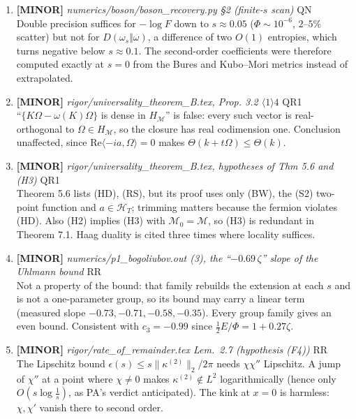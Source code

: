 \documentclass[11pt]{article}
\begin{document}
\begin{enumerate}[leftmargin=1.6em,itemsep=6pt]
\item \textbf{[MINOR]} \emph{numerics/boson/boson\_recovery.py \S2 (finite-\(s\) scan)} \hfill\textsc{QN}\\ Double precision suffices for \(-\log F\) down to \(s\approx0.05\) (\(\Phi\sim10^{-6}\), \(2\)--\(5\%\) scatter) but not for \(D(\omega_s\Vert\omega)\), a difference of two \(O(1)\) entropies, which turns negative below \(s\approx0.1\). The second-order coefficients were therefore computed exactly at \(s=0\) from the Bures and Kubo--Mori metrics instead of extrapolated.
\item \textbf{[MINOR]} \emph{rigor/universality\_theorem\_B.tex, Prop. 3.2 \(\langle1\rangle4\)} \hfill\textsc{QR1}\\ ``\(\{K\Omega-\omega(K)\Omega\}\) is dense in \(H_{\mathcal M}\)'' is false: every such vector is real-orthogonal to \(\Omega\in H_{\mathcal M}\), so the closure has real codimension one. Conclusion unaffected, since \(\mathrm{Re}\langle-ia,\Omega\rangle=0\) makes \(\Theta(k+t\Omega)\le\Theta(k)\).
\item \textbf{[MINOR]} \emph{rigor/universality\_theorem\_B.tex, hypotheses of Thm 5.6 and (H3)} \hfill\textsc{QR1}\\ Theorem 5.6 lists (HD), (RS), but its proof uses only (BW), the (S2) two-point function and \(a\in\mathcal H_T\); trimming matters because the fermion violates (HD). Also (H2) implies (H3) with \(\mathcal M_0=\mathcal M\), so (H3) is redundant in Theorem 7.1. Haag duality is cited three times where locality suffices.
\item \textbf{[MINOR]} \emph{numerics/p1\_bogoliubov.out (3), the ``\(-0.69\,\zeta\)'' slope of the Uhlmann bound} \hfill\textsc{RR}\\ Not a property of the bound: that family rebuilds the extension at each \(s\) and is not a one-parameter group, so its bound may carry a linear term (measured slope \(-0.73,-0.71,-0.58,-0.35\)). Every group family gives an even bound. Consistent with \(c_3=-0.99\) since \(\tfrac12E/\Phi=1+0.27\zeta\).
\item \textbf{[MINOR]} \emph{rigor/rate\_of\_remainder.tex Lem.~2.7 (hypothesis (F4))} \hfill\textsc{RR}\\ The Lipschitz bound \(\epsilon(s)\le s\lVert\kappa^{(2)}\rVert_2/2\pi\) needs \(\chi\chi''\) Lipschitz. A jump of \(\chi''\) at a point where \(\chi\ne0\) makes \(\kappa^{(2)}\notin L^2\) logarithmically (hence only \(O(s\log\frac1s)\), as PA's verdict anticipated). The kink at \(x=0\) is harmless: \(\chi,\chi'\) vanish there to second order.

\end{enumerate}
\end{document}
